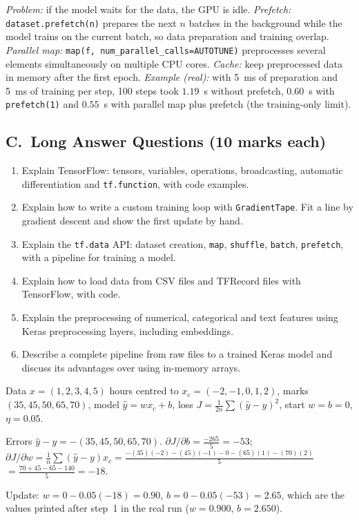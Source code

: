 \begin{modelans}
\emph{Problem:} if the model waits for the data, the GPU is idle. \emph{Prefetch:} \texttt{dataset.prefetch(n)} prepares the next $n$ batches in the background while the model trains on the current batch, so data preparation and training overlap. \emph{Parallel map:} \texttt{map(f, num\_parallel\_calls=AUTOTUNE)} preprocesses several elements simultaneously on multiple CPU cores. \emph{Cache:} keep preprocessed data in memory after the first epoch. \emph{Example (real):} with 5~ms of preparation and 5~ms of training per step, 100 steps took $1.19$~s without prefetch, $0.60$~s with \texttt{prefetch(1)} and $0.55$~s with parallel map plus prefetch (the training-only limit).
\end{modelans}

\subsection*{C.\ Long Answer Questions (10 marks each)}
\begin{enumerate}
  \item Explain TensorFlow: tensors, variables, operations, broadcasting, automatic differentiation and \texttt{tf.function}, with code examples. 
  \item Explain how to write a custom training loop with \texttt{GradientTape}. Fit a line by gradient descent and show the first update by hand. 
  \item Explain the \texttt{tf.data} API: dataset creation, \texttt{map}, \texttt{shuffle}, \texttt{batch}, \texttt{prefetch}, with a pipeline for training a model. 
  \item Explain how to load data from CSV files and TFRecord files with TensorFlow, with code. 
  \item Explain the preprocessing of numerical, categorical and text features using Keras preprocessing layers, including embeddings. 
  \item Describe a complete pipeline from raw files to a trained Keras model and discuss its advantages over using in-memory arrays. 
\end{enumerate}

\begin{modelans}
Data $x=(1,2,3,4,5)$ hours centred to $x_c=(-2,-1,0,1,2)$, marks $(35,45,50,65,70)$, model $\hat y=wx_c+b$, loss $J=\frac1{2n}\sum(\hat y-y)^2$, start $w=b=0$, $\eta=0.05$.\par
Errors $\hat y-y=-(35,45,50,65,70)$. $\partial J/\partial b=\frac{-265}{5}=-53$; $\partial J/\partial w=\frac1n\sum(\hat y-y)x_c=\frac{-(35)(-2)-(45)(-1)-0-(65)(1)-(70)(2)}{5}$ $=\frac{70+45-65-140}{5}=-18$.\par
Update: $w=0-0.05(-18)=0.90$, $b=0-0.05(-53)=2.65$, which are the values printed after step~1 in the real run ($w=0.900$, $b=2.650$).
\end{modelans}

